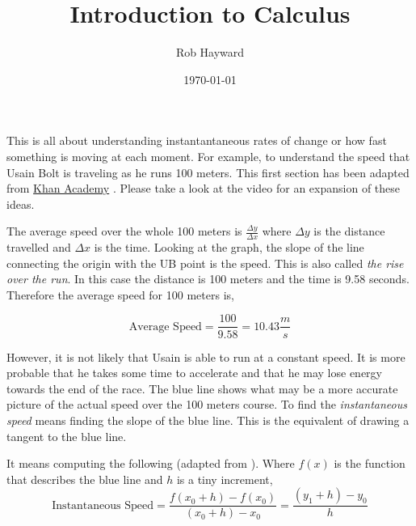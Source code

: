 \documentclass[12pt, a4paper, oneside]{article}\usepackage[]{graphicx}\usepackage[]{color}
\begin{document}
\title{Introduction to Calculus}
\author{Rob Hayward}
\date{\today}
\maketitle
This is all about understanding instantantaneous rates of change or how fast something is moving at each moment. For example, to understand the speed that Usain Bolt is traveling as he runs 100 meters. This first section has been adapted from \href{https://www.khanacademy.org/math/calculus/differential-calculus/intro_differential_calc/v/newton-leibniz-and-usain-bolt}{Khan Academy} 
\cite{Khan1}.  Please take a look at the video for an expansion of these ideas. 

\vspace{5 mm}

The average speed over the whole 100  meters is $\frac{\Delta y}{\Delta x}$ where $\Delta y$ is the distance travelled and $\Delta x$ is the time.  Looking at the graph, the slope of the line connecting the origin with the UB point is the speed.  This is also called \emph{the rise over the run}.  In this case the distance is 100 meters and the time is 9.58 seconds.  Therefore the average speed for 100 meters is,  

$$\text{Average Speed} = \frac{100}{9.58} = 10.43\frac{m}{s}$$

However, it is not likely that Usain is able to run at a constant speed.  It is more probable that he takes some time to accelerate and that he may lose energy towards the end of the race. The blue line shows what may be a more accurate picture of the actual speed over the 100 meters course.  To find the \emph{instantaneous speed} means finding the slope of the blue line. This is the equivalent of drawing a tangent to the blue line.  

It means computing the following (adapted from \cite{Maths}).
\vspace{5 mm}
Where $f(x)$ is the function that describes the blue line and $h$ is a tiny increment, 
\vspace{5 mm}
$$\text{Instantaneous Speed} = \frac{f(x_0 + h) - f(x_0)}{(x_0 +h) - x_0} = \frac{(y_1 + h) - y_0}{h}$$
\end{document}
